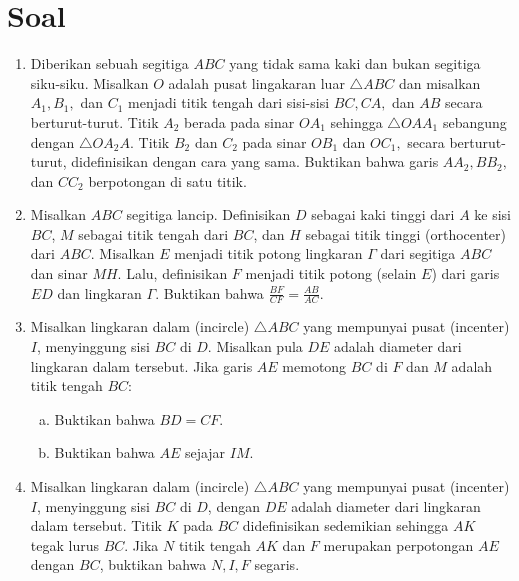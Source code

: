 \documentclass[12pt]{scrartcl}
\begin{document}
\section{Soal}
\begin{enumerate}
    \item Diberikan sebuah segitiga $ABC$ yang tidak sama kaki dan bukan segitiga siku-siku. Misalkan $O$ adalah pusat lingakaran luar $\triangle ABC$ dan misalkan $A_1, B_1,$ dan $C_1$ menjadi titik tengah dari sisi-sisi $BC,CA,$ dan $AB$ secara berturut-turut. Titik $A_2$ berada pada sinar $OA_1$ sehingga $\triangle OAA_1$ sebangung dengan $\triangle OA_2A$. Titik $B_2$ dan $C_2$ pada sinar $OB_1$ dan $OC_1,$ secara berturut-turut, didefinisikan dengan cara yang sama. Buktikan bahwa garis $AA_2, BB_2,$ dan $CC_2$ berpotongan di satu titik.

    \item Misalkan $ ABC $ segitiga lancip. Definisikan $ D $ sebagai kaki tinggi dari $ A $ ke sisi $ BC $, $M$ sebagai titik tengah dari $ BC $, dan $ H $ sebagai titik tinggi (orthocenter) dari $ ABC $. Misalkan $ E $ menjadi titik potong lingkaran $ \Gamma $ dari segitiga $ ABC $ dan sinar $ MH $. Lalu, definisikan $ F $ menjadi titik potong (selain $E$) dari garis $ ED $ dan lingkaran $ \Gamma $. Buktikan bahwa $ \tfrac{BF}{CF} = \tfrac{AB}{AC} $.
    \item Misalkan lingkaran dalam (incircle) $\triangle ABC$ yang mempunyai pusat (incenter) $I$, menyinggung sisi $BC$ di $D$. Misalkan pula $DE$ adalah diameter dari lingkaran dalam tersebut. Jika garis $AE$ memotong $BC$ di $F$ dan $M$ adalah titik tengah $BC$:
    \begin{enumerate}[(a)]
        \item Buktikan bahwa $BD=CF$.
        \item Buktikan bahwa $AE$ sejajar $IM$.
    \end{enumerate}

    \item Misalkan lingkaran dalam (incircle) $\triangle ABC$ yang mempunyai pusat (incenter) $I$, menyinggung sisi $BC$ di $D$, dengan $DE$ adalah diameter dari lingkaran dalam tersebut. Titik $K$ pada $BC$ didefinisikan sedemikian sehingga $AK$ tegak lurus $BC$. Jika $N$ titik tengah $AK$ dan $F$ merupakan perpotongan $AE$ dengan $BC$, buktikan bahwa $N,I,F$ segaris.
\end{enumerate}
\end{document}
